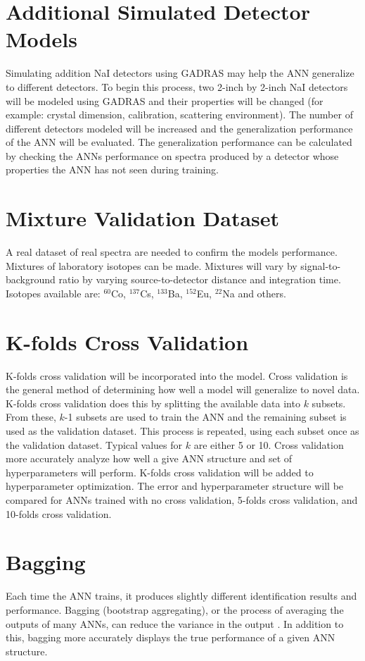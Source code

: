 \documentclass[tocnosub,noragright,centerchapter,12pt,fullpage]{uiucecethesis09}
\begin{document}
\section{Additional Simulated Detector Models}

Simulating addition NaI detectors using GADRAS may help the ANN generalize to different detectors. To begin this process, two 2-inch by 2-inch NaI detectors will be modeled using GADRAS and their properties will be changed (for example: crystal dimension, calibration, scattering environment). The number of different detectors modeled will be increased and the generalization performance of the ANN will be evaluated. The generalization performance can be calculated by checking the ANNs performance on spectra produced by a detector whose properties the ANN has not seen during training.  

\section{Mixture Validation Dataset}

A real dataset of real spectra are needed to confirm the models performance. Mixtures of laboratory isotopes can be made. Mixtures will vary by signal-to-background ratio by varying source-to-detector distance and integration time. Isotopes available are: $^{60}$Co, $^{137}$Cs, $^{133}$Ba, $^{152}$Eu, $^{22}$Na and others. %

\section{K-folds Cross Validation}
K-folds cross validation will be incorporated into the model. Cross validation is the general method of determining how well a model will generalize to novel data. K-folds cross validation does this by splitting the available data into $k$ subsets. From these, $k$-1 subsets are used to train the ANN and the remaining subset is used as the validation dataset. This process is repeated, using each subset once as the validation dataset. Typical values for $k$ are either 5 or 10. Cross validation more accurately analyze how well a give ANN structure and set of hyperparameters will perform. K-folds cross validation will be added to hyperparameter optimization. The error and hyperparameter structure will be compared for ANNs trained with no cross validation, 5-folds cross validation, and 10-folds cross validation.

\section{Bagging}
Each time the ANN trains, it produces slightly different identification results and performance. Bagging (bootstrap aggregating), or the process of averaging the outputs of many ANNs, can reduce the variance in the output \cite{Breiman1996}. In addition to this, bagging more accurately displays the true performance of a given ANN structure.
\end{document}
